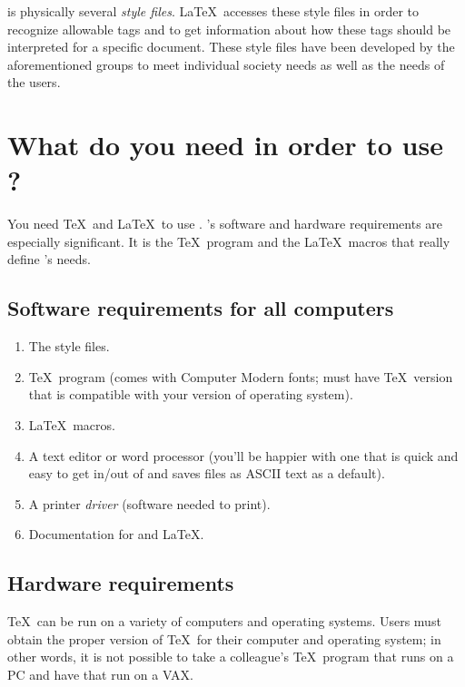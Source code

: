 \REVTeX{} is physically several {\it style files}. \LaTeX\ accesses these
style files in order to recognize allowable tags and to get information
about how these tags should be interpreted for a specific document. These
\REVTeX{} style files have been developed by the aforementioned groups to
meet individual society needs as well as the needs of the users.

\section{What do you need in order to use \REVTeX{}?}

You need \TeX\ and \LaTeX\ to use \REVTeX{}. \REVTeX's software and
hardware requirements are especially significant.  It is the \TeX\ program
and the \LaTeX\ macros that really define \REVTeX's needs.

\subsection{Software requirements for all computers}

\begin{enumerate}

\item The \REVTeX{} style files.

\item \TeX\ program (comes with Computer Modern fonts; must have \TeX\
version that is compatible with your version of operating system).

\item \LaTeX\ macros.

\item A text editor or word processor (you'll be happier with one that is
quick and easy to get in/out of and saves files as ASCII text as a
default).

\item A printer {\it driver} (software needed to print).

\item Documentation for \REVTeX{} and \LaTeX.
\end{enumerate}

\subsection{Hardware requirements}

\TeX\ can be run on a variety of computers and operating systems.  Users
must obtain the proper version of \TeX\ for their computer and operating
system; in other words, it is not possible to take a colleague's
\TeX\ program that runs on a PC and have that run on a VAX.


